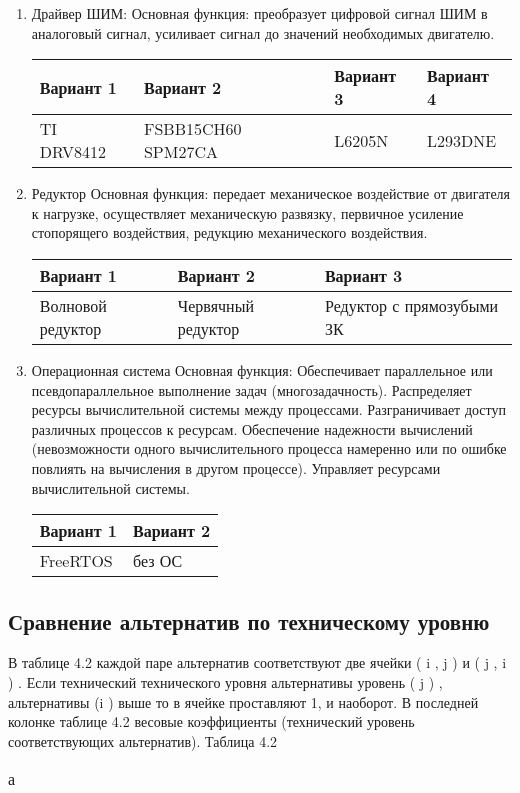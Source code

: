 \begin{enumerate}
    \item Драйвер ШИМ:
        Основная функция: преобразует цифровой сигнал ШИМ в аналоговый сигнал,
        усиливает сигнал до значений необходимых двигателю.

        \begin{tabular}{|p{3.5cm}|p{3.5cm}|p{3.5cm}|p{3.5cm}|}
            \hline
            Вариант 1 & Вариант 2 & Вариант 3 & Вариант 4 \\
            \hline
            TI DRV8412 &
            FSBB15CH60 SPM27CA &
            L6205N &
            L293DNE \\
            \hline
        \end{tabular}

    \item Редуктор
        Основная функция: передает механическое воздействие от двигателя к
        нагрузке, осуществляет механическую развязку, первичное усиление
        стопорящего воздействия, редукцию механического воздействия.

        \begin{tabular}{|p{3.5cm}|p{3.5cm}|p{3.5cm}|}
            \hline
            Вариант 1 & Вариант 2 & Вариант 3 \\
            \hline
            Волновой редуктор &
            Червячный редуктор &
            Редуктор с прямозубыми ЗК \\
            \hline
        \end{tabular}

    \item Операционная система
        Основная функция: Обеспечивает параллельное или псевдопараллельное
        выполнение задач (многозадачность). Распределяет ресурсы вычислительной
        системы между процессами. Разграничивает доступ различных процессов к
        ресурсам. Обеспечение надежности вычислений (невозможности одного
        вычислительного процесса намеренно или по ошибке повлиять на вычисления
        в другом процессе). Управляет ресурсами вычислительной системы.

        \begin{tabular}{|p{3.5cm}|p{3.5cm}|}
            \hline
            Вариант 1 & Вариант 2 \\
            \hline
            FreeRTOS &
            без ОС \\
            \hline
        \end{tabular}
\end{enumerate}

\subsection{Сравнение альтернатив по техническому уровню}
В таблице 4.2 каждой паре альтернатив соответствуют две ячейки
( i , j ) и
( j , i ) .
Если
технический
технического уровня альтернативы
уровень
( j ) ,
альтернативы
(i )
выше
то в ячейке проставляют 1, и
наоборот.
В последней колонке таблице 4.2 весовые коэффициенты
(технический уровень соответствующих альтернатив).
Таблица 4.2

\begin{table}[h!]
    \centering
    \begin{tabular}{|p{3.5cm}|p{3.5cm}|}
    \end{tabular}
    \caption{а}
    \label{}
\end{table}

